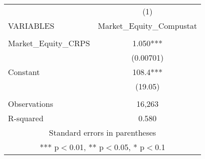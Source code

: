 \begin{tabular}{lc} \hline
 & (1) \\
VARIABLES & Market\_Equity\_Compustat \\ \hline
 &  \\
Market\_Equity\_CRPS & 1.050*** \\
 & (0.00701) \\
Constant & 108.4*** \\
 & (19.05) \\
 &  \\
Observations & 16,263 \\
 R-squared & 0.580 \\ \hline
\multicolumn{2}{c}{ Standard errors in parentheses} \\
\multicolumn{2}{c}{ *** p$<$0.01, ** p$<$0.05, * p$<$0.1} \\
\end{tabular}
